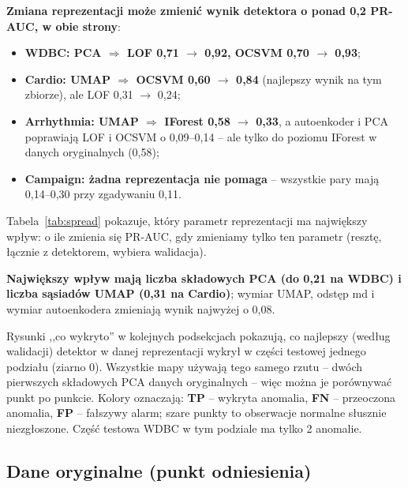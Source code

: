 \documentclass[11pt,a4paper]{article}
\begin{document}
\textbf{Zmiana reprezentacji może zmienić wynik detektora o ponad 0,2
PR-AUC, w obie strony}:
\begin{itemize}
  \item \textbf{WDBC: PCA $\Rightarrow$ LOF 0,71 $\rightarrow$ 0,92, OCSVM
  0,70 $\rightarrow$ 0,93};
  \item \textbf{Cardio: UMAP $\Rightarrow$ OCSVM 0,60 $\rightarrow$ 0,84}
  (najlepszy wynik na tym zbiorze), ale LOF 0,31 $\rightarrow$ 0,24;
  \item \textbf{Arrhythmia: UMAP $\Rightarrow$ IForest 0,58 $\rightarrow$
  0,33}, a autoenkoder i PCA poprawiają LOF i OCSVM o 0,09--0,14 -- ale
  tylko do poziomu IForest w danych oryginalnych (0,58);
  \item \textbf{Campaign: żadna reprezentacja nie pomaga} -- wszystkie pary
  mają 0,14--0,30 przy zgadywaniu 0,11.
\end{itemize}

Tabela~\ref{tab:spread} pokazuje, który parametr reprezentacji ma największy
wpływ: o ile zmienia się PR-AUC, gdy zmieniamy tylko ten parametr (resztę,
łącznie z detektorem, wybiera walidacja).

\begin{table}[H]
  \centering\small
  \caption{Wpływ parametrów reprezentacji: różnica PR-AUC między najlepszą
  a najgorszą wartością parametru (,,--'' -- na Campaign badano jedną wartość).}
  \label{tab:spread}
\end{table}

\textbf{Największy wpływ mają liczba składowych PCA (do 0,21 na WDBC)
i liczba sąsiadów UMAP (0,31 na Cardio)}; wymiar UMAP, odstęp md i wymiar
autoenkodera zmieniają wynik najwyżej o 0,08.

Rysunki ,,co wykryto'' w kolejnych podsekcjach pokazują, co najlepszy (według
walidacji) detektor w danej reprezentacji wykrył w części testowej jednego
podziału (ziarno 0). Wszystkie mapy używają tego samego rzutu -- dwóch
pierwszych składowych PCA danych oryginalnych -- więc można je porównywać
punkt po punkcie. Kolory oznaczają: \textbf{TP} -- wykryta anomalia,
\textbf{FN} -- przeoczona anomalia, \textbf{FP} -- fałszywy alarm; szare
punkty to obserwacje normalne słusznie niezgłoszone. Część testowa WDBC
w tym podziale ma tylko 2 anomalie.

\FloatBarrier
\subsection{Dane oryginalne (punkt odniesienia)}
\end{document}
